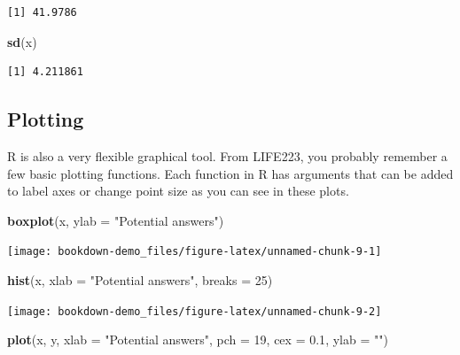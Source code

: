 \documentclass[
]{book}
\newenvironment{Shaded}{\begin{snugshade}}{\end{snugshade}}
\newcommand{\DataTypeTok}[1]{\textcolor[rgb]{0.13,0.29,0.53}{#1}}
\newcommand{\DecValTok}[1]{\textcolor[rgb]{0.00,0.00,0.81}{#1}}
\newcommand{\FloatTok}[1]{\textcolor[rgb]{0.00,0.00,0.81}{#1}}
\newcommand{\KeywordTok}[1]{\textcolor[rgb]{0.13,0.29,0.53}{\textbf{#1}}}
\newcommand{\NormalTok}[1]{#1}
\newcommand{\StringTok}[1]{\textcolor[rgb]{0.31,0.60,0.02}{#1}}
\begin{document}
\begin{verbatim}
[1] 41.9786
\end{verbatim}

\begin{Shaded}
\begin{Highlighting}[]
\KeywordTok{sd}\NormalTok{(x)}
\end{Highlighting}
\end{Shaded}

\begin{verbatim}
[1] 4.211861
\end{verbatim}

\hypertarget{plotting}{%
\subsection{Plotting}\label{plotting}}

R is also a very flexible graphical tool. From LIFE223, you probably remember a few basic plotting functions. Each function in R has arguments that can be added to label axes or change point size as you can see in these plots.

\begin{Shaded}
\begin{Highlighting}[]
\KeywordTok{boxplot}\NormalTok{(x, }\DataTypeTok{ylab =} \StringTok{"Potential answers"}\NormalTok{)}
\end{Highlighting}
\end{Shaded}

\begin{center}\texttt{[image: bookdown-demo\_files/figure-latex/unnamed-chunk-9-1]} \end{center}

\begin{Shaded}
\begin{Highlighting}[]
\KeywordTok{hist}\NormalTok{(x, }\DataTypeTok{xlab =} \StringTok{"Potential answers"}\NormalTok{, }\DataTypeTok{breaks =} \DecValTok{25}\NormalTok{)}
\end{Highlighting}
\end{Shaded}

\begin{center}\texttt{[image: bookdown-demo\_files/figure-latex/unnamed-chunk-9-2]} \end{center}

\begin{Shaded}
\begin{Highlighting}[]
\KeywordTok{plot}\NormalTok{(x, y, }\DataTypeTok{xlab =} \StringTok{"Potential answers"}\NormalTok{, }\DataTypeTok{pch =} \DecValTok{19}\NormalTok{, }\DataTypeTok{cex =} \FloatTok{0.1}\NormalTok{, }\DataTypeTok{ylab =} \StringTok{""}\NormalTok{)}
\end{Highlighting}
\end{Shaded}
\end{document}
